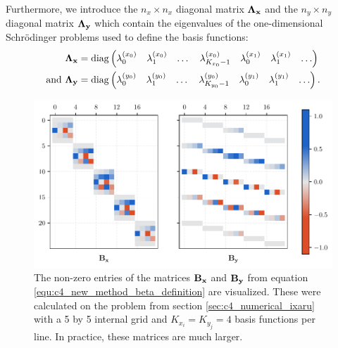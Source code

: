 Furthermore, we introduce the $n_x \times n_x$ diagonal matrix $\vb{\Lambda_x}$ and the $n_y \times n_y$ diagonal matrix $\vb{\Lambda_y}$ which contain the eigenvalues of the one-dimensional Schrödinger problems used to define the basis functions:
\begin{align*}
    \vb{\Lambda_x}            & = \operatorname{diag}\begin{pmatrix} \lambda_0^{(x_0)} & \lambda_1^{(x_0)} & \dots & \lambda_{K_{x_0}-1}^{(x_0)} & \lambda_0^{(x_1)} & \lambda_1^{(x_1)} & \dots \end{pmatrix}         \\
    \text{and }\vb{\Lambda_y} & = \operatorname{diag}\begin{pmatrix} \lambda_0^{(y_0)} & \lambda_1^{(y_0)} & \dots & \lambda_{K_{y_0}-1}^{(y_0)} & \lambda_0^{(y_1)} & \lambda_1^{(y_1)} & \dots \end{pmatrix}\text{.} \\
\end{align*}

\begin{figure}
    \begin{center}
        \includegraphics[width=\textwidth]{img/chapter4/new_method_beta.pdf}
        \caption{The non-zero entries of the matrices $\vb{B_x}$ and $\vb{B_y}$ from equation \eqref{equ:c4_new_method_beta_definition} are visualized. These were calculated on the problem from section \ref{sec:c4_numerical_ixaru} with a 5 by 5 internal grid and $K_{x_i} = K_{y_j} = 4$ basis functions per line. In practice, these matrices are much larger.}
        \label{fig:c4_new_method_beta}
    \end{center}
\end{figure}

